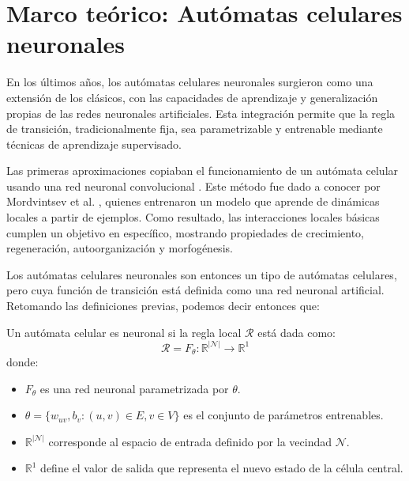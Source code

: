 \chapter{Marco teórico: Autómatas celulares neuronales}

En los últimos años, los autómatas celulares neuronales surgieron como una extensión de los clásicos, con las capacidades de aprendizaje y generalización propias de las redes neuronales artificiales. Esta integración permite que la regla de transición, tradicionalmente fija, sea parametrizable y entrenable mediante técnicas de aprendizaje supervisado.

Las primeras aproximaciones copiaban el funcionamiento de un autómata celular usando una red neuronal convolucional \cite{gilpin2019_nca}. Este método fue dado a conocer por Mordvintsev et al. \cite{mordvintsev2020_nca}, quienes entrenaron un modelo que aprende de dinámicas locales a partir de ejemplos. Como resultado, las interacciones locales básicas cumplen un objetivo en específico, mostrando propiedades de crecimiento, regeneración, autoorganización y morfogénesis.

Los autómatas celulares neuronales son entonces un tipo de autómatas celulares, pero cuya función de transición está definida como una red neuronal artificial. Retomando las definiciones previas, podemos decir entonces que:

\begin{definition}
	
	Un autómata celular es neuronal si la regla local $\mathcal{R}$ está dada como:
	\[
	\mathcal{R} = F_\theta: \mathbb{R}^{|\mathcal{N}|} \to \mathbb{R}^1
	\]
	donde:
	
	\begin{itemize}
		
		\item $F_\theta$ es una red neuronal parametrizada por $\theta$.
		
		\item $ \theta = \{ w_{uv}, b_v : (u, v) \in E, v \in V \}$ es el conjunto de parámetros entrenables.
		
		\item $\mathbb{R}^{|\mathcal{N}|}$ corresponde al espacio de entrada definido por la vecindad $\mathcal{N}$.
		
		\item $\mathbb{R}^1$ define el valor de salida que representa el nuevo estado de la célula central.
		
	\end{itemize}
	
\end{definition}

